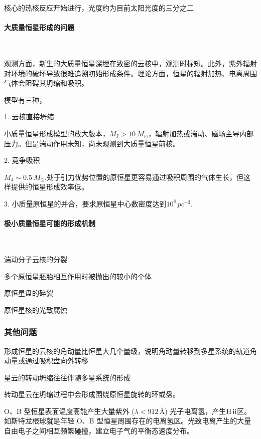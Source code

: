 \documentclass[../天体物理基础.tex]{subfiles}
\begin{document}
核心的热核反应开始进行，光度约为目前太阳光度的三分之二

\paragraph{大质量恒星形成的问题}~{}

观测方面，新生的大质量恒星深埋在致密的云核中，观测时标短。此外，紫外辐射对环境的破坏导致很难追溯初始形成条件。理论方面，恒星的辐射加热、电离周围气体会阻碍其坍缩和吸积。

模型有三种，

1. 云核直接坍缩

小质量恒星形成模型的放大版本，$M_{\text{J}}>\qty{10}{M_{\odot}}$，辐射加热或湍动、磁场主导内部压力。但是湍动作用未知，尚未观测到大质量恒星前核。

2. 竞争吸积

$M_{\text{J}}\sim\qty{0.5}{M_{\odot}}$,处于引力优势位置的原恒星更容易通过吸积周围的气体生长，但这样提供的恒星形成效率低。

3. 小质量原恒星的并合，要求原恒星中心数密度达到$10^{8}\,\unit{pc^{-3}}$.

\paragraph{极小质量恒星可能的形成机制}~{}

湍动分子云核的分裂

多个原恒星胚胎相互作用时被抛出的较小的个体

原恒星盘的碎裂

原恒星核的光致腐蚀

\subsubsection{其他问题}

形成恒星的云核的角动量比恒星大几个量级，说明角动量转移到多星系统的轨道角动量或通过吸积盘向外转移

星云的转动坍缩往往伴随多星系统的形成

转动星云在坍缩过程中会形成围绕原恒星旋转的环或盘。




O、B 型恒星表面温度高能产生大量紫外 ($\lambda<912\,\unit{\angstrom}$) 光子电离氢，产生$\ce{H}\,\mathrm{\uppercase\expandafter{\romannumeral2}}$区。如斯特龙根球就是年轻 O、B 型恒星周围存在的电离氢区。光致电离产生的大量自由电子之间相互频繁碰撞，建立电子气的平衡态速度分布。



\end{document}
